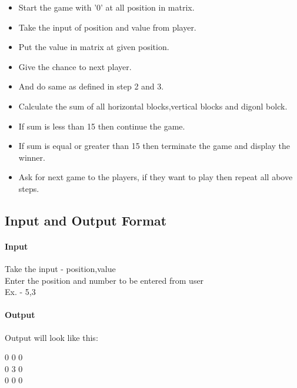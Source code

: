 \documentclass[a4paper,10pt]{report}
\begin{document}
\begin{itemize}
 \item Start the game with '0' at all position in matrix.
 \item Take the input of position and value from player.
 \item Put the value in matrix at given position.
 \item Give the chance to next player.
 \item And do same as defined in step 2 and 3.
 \item Calculate the sum of all horizontal blocks,vertical blocks and digonl bolck.
 \item If sum is less than 15 then continue the game.
 \item If sum is equal or greater than 15 then terminate the game and display the winner.
 \item Ask for next game to the players, if they want to play then repeat all above steps.

\end{itemize}


%

\subsection{Input and Output Format}

\paragraph{Input}

Take the input - position,value\\
Enter the position and number to be entered from user\\
Ex. - 5,3


\paragraph{Output}
Output will look like this:\\

\begin{center}
 0 0 0\\
 0 3 0\\
 0 0 0\\

\end{center}
\end{document}
